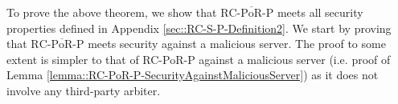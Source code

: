  To prove the above theorem, we show that ${\text{RC-}\overline{\text{PoR}}\text{-P}}$ meets all security properties defined in Appendix \ref{sec::RC-S-P-Definition2}.  We start by proving that ${\text{RC-}\overline{\text{PoR}}\text{-P}}$ meets security against a malicious server.   The proof to some extent is  simpler to that  of RC-PoR-P against a malicious server (i.e. proof of Lemma \ref{lemma::RC-PoR-P-SecurityAgainstMaliciousServer})  as it does not involve any third-party arbiter. 

 
 





